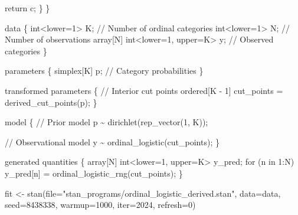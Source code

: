 \documentclass[
  letterpaper,
  DIV=11,
  numbers=noendperiod]{scrartcl}
\newenvironment{Shaded}{\begin{snugshade}}{\end{snugshade}}
\newcommand{\AttributeTok}[1]{\textcolor[rgb]{0.40,0.45,0.13}{#1}}
\newcommand{\CommentTok}[1]{\textcolor[rgb]{0.37,0.37,0.37}{#1}}
\newcommand{\ControlFlowTok}[1]{\textcolor[rgb]{0.00,0.23,0.31}{#1}}
\newcommand{\DataTypeTok}[1]{\textcolor[rgb]{0.68,0.00,0.00}{#1}}
\newcommand{\DecValTok}[1]{\textcolor[rgb]{0.68,0.00,0.00}{#1}}
\newcommand{\FunctionTok}[1]{\textcolor[rgb]{0.28,0.35,0.67}{#1}}
\newcommand{\KeywordTok}[1]{\textcolor[rgb]{0.00,0.23,0.31}{#1}}
\newcommand{\NormalTok}[1]{\textcolor[rgb]{0.00,0.23,0.31}{#1}}
\newcommand{\OtherTok}[1]{\textcolor[rgb]{0.00,0.23,0.31}{#1}}
\newcommand{\StringTok}[1]{\textcolor[rgb]{0.13,0.47,0.30}{#1}}
\begin{document}
\begin{codelisting}
\begin{Shaded}
\begin{Highlighting}[]
    \ControlFlowTok{return}\NormalTok{ c;}
\NormalTok{  \}}
\NormalTok{\}}

\KeywordTok{data}\NormalTok{ \{}
  \DataTypeTok{int}\NormalTok{\textless{}}\KeywordTok{lower}\NormalTok{=}\DecValTok{1}\NormalTok{\textgreater{} K;                   }\CommentTok{// Number of ordinal categories}
  \DataTypeTok{int}\NormalTok{\textless{}}\KeywordTok{lower}\NormalTok{=}\DecValTok{1}\NormalTok{\textgreater{} N;                   }\CommentTok{// Number of observations}
  \DataTypeTok{array}\NormalTok{[N] }\DataTypeTok{int}\NormalTok{\textless{}}\KeywordTok{lower}\NormalTok{=}\DecValTok{1}\NormalTok{, }\KeywordTok{upper}\NormalTok{=K\textgreater{} y; }\CommentTok{// Observed categories}
\NormalTok{\}}

\KeywordTok{parameters}\NormalTok{ \{}
  \DataTypeTok{simplex}\NormalTok{[K] p; }\CommentTok{// Category probabilities}
\NormalTok{\}}

\KeywordTok{transformed parameters}\NormalTok{ \{}
  \CommentTok{// Interior cut points}
  \DataTypeTok{ordered}\NormalTok{[K {-} }\DecValTok{1}\NormalTok{] cut\_points = derived\_cut\_points(p);}
\NormalTok{\}}

\KeywordTok{model}\NormalTok{ \{}
  \CommentTok{// Prior model}
\NormalTok{  p \textasciitilde{} dirichlet(rep\_vector(}\DecValTok{1}\NormalTok{, K));}

  \CommentTok{// Observational model}
\NormalTok{  y \textasciitilde{} ordinal\_logistic(cut\_points);}
\NormalTok{\}}

\KeywordTok{generated quantities}\NormalTok{ \{}
  \DataTypeTok{array}\NormalTok{[N] }\DataTypeTok{int}\NormalTok{\textless{}}\KeywordTok{lower}\NormalTok{=}\DecValTok{1}\NormalTok{, }\KeywordTok{upper}\NormalTok{=K\textgreater{} y\_pred;}
  \ControlFlowTok{for}\NormalTok{ (n }\ControlFlowTok{in} \DecValTok{1}\NormalTok{:N)}
\NormalTok{    y\_pred[n] = ordinal\_logistic\_rng(cut\_points);}
\NormalTok{\}}
\end{Highlighting}
\end{Shaded}

\end{codelisting}

\begin{Shaded}
\begin{Highlighting}[]
\NormalTok{fit }\OtherTok{\textless{}{-}} \FunctionTok{stan}\NormalTok{(}\AttributeTok{file=}\StringTok{"stan\_programs/ordinal\_logistic\_derived.stan"}\NormalTok{,}
            \AttributeTok{data=}\NormalTok{data, }\AttributeTok{seed=}\DecValTok{8438338}\NormalTok{,}
            \AttributeTok{warmup=}\DecValTok{1000}\NormalTok{, }\AttributeTok{iter=}\DecValTok{2024}\NormalTok{, }\AttributeTok{refresh=}\DecValTok{0}\NormalTok{)}
\end{Highlighting}
\end{Shaded}
\end{document}
